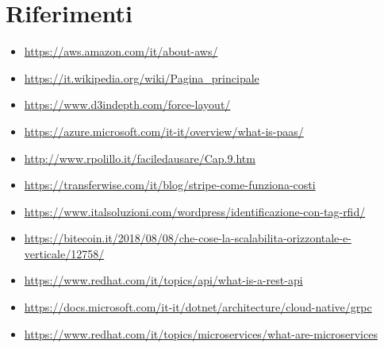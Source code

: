 \section{Riferimenti}
\begin{itemize}
	\item \url{https://aws.amazon.com/it/about-aws/}
	\item \url{https://it.wikipedia.org/wiki/Pagina\_principale}
	\item \url{https://www.d3indepth.com/force-layout/}
	\item \url{https://azure.microsoft.com/it-it/overview/what-is-paas/}
	\item \url{http://www.rpolillo.it/faciledausare/Cap.9.htm}
	\item \url{https://transferwise.com/it/blog/stripe-come-funziona-costi}
	\item \url{https://www.italsoluzioni.com/wordpress/identificazione-con-tag-rfid/}
	\item \url{https://bitecoin.it/2018/08/08/che-cose-la-scalabilita-orizzontale-e-verticale/12758/}
	\item\url{https://www.redhat.com/it/topics/api/what-is-a-rest-api}
	\item\url{https://docs.microsoft.com/it-it/dotnet/architecture/cloud-native/grpc}
	\item \url{https://www.redhat.com/it/topics/microservices/what-are-microservices}
\end{itemize}
